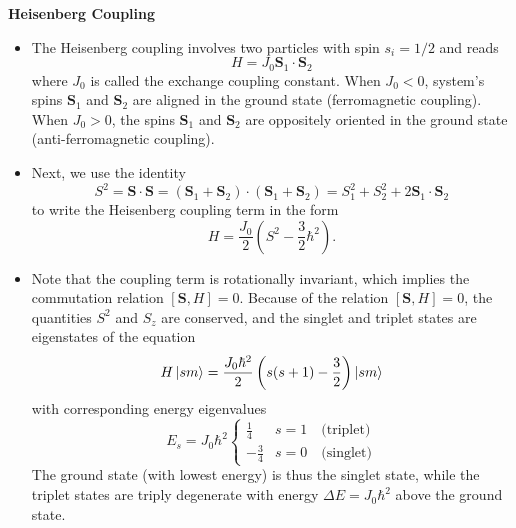 \documentclass[11pt, a4paper]{article}
\renewcommand{\vec}[1]{\bm{#1}}  %
\renewcommand{\S}{\vec{S}}  %
\begin{document}
\textbf{Heisenberg Coupling}
\begin{itemize}
    \item The Heisenberg coupling involves two particles with spin $ s_{i} = 1/2 $ and reads
    \begin{equation*}
        H = J_{0} \S_{1} \cdot \S_{2}
    \end{equation*}
    where $ J_{0} $ is called the exchange coupling constant. When $ J_{0} < 0 $, system's spins $ \S_{1} $ and $ \S_{2} $ are aligned in the ground state (ferromagnetic coupling). When $ J_{0} > 0 $, the spins $ \S_{1} $ and $ \S_{2} $ are oppositely oriented in the ground state (anti-ferromagnetic coupling). 

    \item Next, we use the identity
    \begin{equation*}
        S^{2} = \S \cdot \S = (\S_{1} + \S_{2}) \cdot (\S_{1} + \S_{2}) = S_{1}^{2} + S_{2}^{2} + 2 \S_{1} \cdot \S_{2}
    \end{equation*}
    to write the Heisenberg coupling term in the form
    \begin{equation*}
        H = \frac{J_{0}}{2}\left( S^{2} - \frac{3}{2} \hbar^{2} \right).
    \end{equation*}
    
    \item Note that the coupling term is rotationally invariant, which implies the commutation relation $ [\S, H] = 0 $. Because of the relation $ [\S, H] = 0 $, the quantities $ S^{2} $ and $ S_{z} $ are conserved, and the singlet and triplet states are eigenstates of the equation
    \begin{equation*}
        H \ket{sm} = \frac{J_{0}\hbar^{2}}{2} \left( s(s + 1) - \frac{3}{2} \right)\ket{sm}
    \end{equation*}
    with corresponding energy eigenvalues
    \begin{equation*}
        E_{s} = J_{0}\hbar^{2} 
        \begin{cases}
            \frac{1}{4} & s = 1 \quad \text{(triplet)}\\
            -\frac{3}{4} & s = 0 \quad \text{(singlet)}
        \end{cases}
    \end{equation*}
    The ground state (with lowest energy) is thus the singlet state, while the triplet states are triply degenerate with energy $ \Delta E = J_{0}\hbar^{2} $ above the ground state.

\end{itemize}
\end{document}
